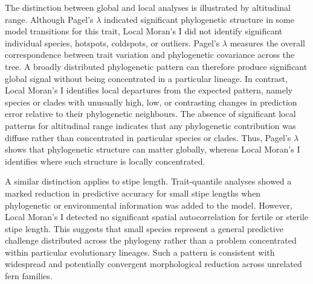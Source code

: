 \documentclass[preprint,12pt,authoryear]{elsarticle}
\begin{document}
The distinction between global and local analyses is illustrated by altitudinal range. Although Pagel's $\lambda$ indicated significant phylogenetic structure in some model transitions for this trait, Local Moran’s I did not identify significant individual species, hotspots, coldspots, or outliers. Pagel's $\lambda$ measures the overall correspondence between trait variation and phylogenetic covariance across the tree. A broadly distributed phylogenetic pattern can therefore produce significant global signal without being concentrated in a particular lineage.
In contrast, Local Moran’s I identifies local departures from the expected pattern, namely species or clades with unusually high, low, or contrasting changes in prediction error relative to their phylogenetic neighbours. The absence of significant local patterns for altitudinal range indicates that any phylogenetic contribution was diffuse rather than concentrated in particular species or clades. Thus, Pagel's $\lambda$ shows that phylogenetic structure can matter globally, whereas Local Moran’s I identifies where such structure is locally concentrated.

A similar distinction applies to stipe length. Trait-quantile analyses showed a marked reduction in predictive accuracy for small stipe lengths when phylogenetic or environmental information was added to the model. However, Local Moran’s I detected no significant spatial autocorrelation for fertile or sterile stipe length. This suggests that small species represent a general predictive challenge distributed across the phylogeny rather than a problem concentrated within particular evolutionary lineages. Such a pattern is consistent with widespread and potentially convergent morphological reduction across unrelated fern families.
\end{document}
